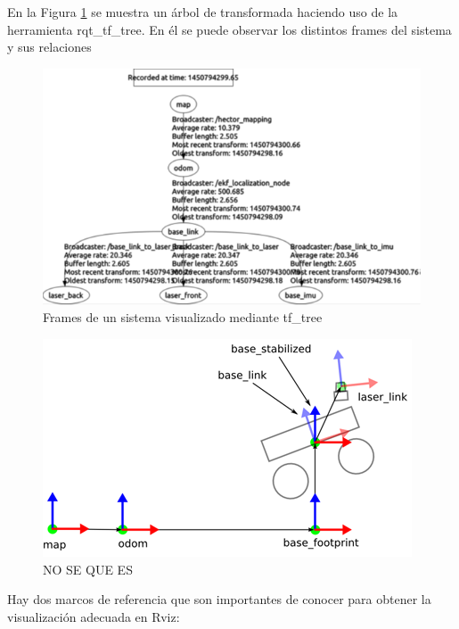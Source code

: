         En la Figura \ref{f:Cap3-6_sistema_arbol_tf} se muestra un árbol de transformada haciendo uso de la herramienta rqt\_tf\_tree. En él se puede observar los distintos frames del sistema y sus relaciones
        
        \begin{figure}[htb]
            \centering
            \includegraphics[width=1.0\linewidth]{Main/Chapter3/Images3/3-6/ejemplo-frames-sistema-arbol.png}
            \caption{Frames de un sistema visualizado mediante tf\_tree}
            \label{f:Cap3-6_sistema_arbol_tf}
        \end{figure} 
        
        \begin{figure}[htb]
            \centering
            \includegraphics[width=1.0\linewidth]{Main/Chapter3/Images3/3-6/nose2.png}
            \caption{NO SE QUE ES}
            \label{f:Cap3-6_NOSE_tf}
        \end{figure} 
        
        Hay dos marcos de referencia que son importantes de conocer para obtener la visualización adecuada en Rviz:
        
